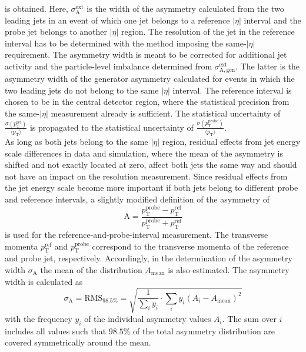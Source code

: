 is obtained. Here, $\sigma_\mathrm{A}^\mathrm{ext}$ is the width of the asymmetry calculated from the two leading jets in an event of which one jet belongs to a reference $|\eta|$ interval and the probe jet belongs to another $|\eta|$ region. The resolution of the jet in the reference interval has to be determined with the method imposing the same-$|\eta|$ requirement. The asymmetry width is meant to be corrected for additional jet activity and the particle-level imbalance determined from $\sigma_\mathrm{A, \mathrm{gen}}^\mathrm{ext}$. The latter is the asymmetry width of the generator asymmetry calculated for events in which the two leading jets do not belong to the same $|\eta|$ interval. The reference interval is chosen to be in the central detector region, where the statistical precision from the same-$|\eta|$ measurement already is sufficient. The statistical uncertainty of $\frac{\sigma (p^\mathrm{ref}_\mathrm{T})}{{\langle p_\mathrm{T} \rangle}}$ is propagated to the statistical uncertainty of $\frac{\sigma (p^\mathrm{probe}_\mathrm{T})}{\langle p_\mathrm{T} \rangle}$. \\
As long as both jets belong to the same $|\eta|$ region, residual effects from jet energy scale differences in data and simulation, where the mean of the asymmetry is shifted and not exactly located at zero, affect both jets the same way and should not have an impact on the resolution measurement. Since residual effects from the jet energy scale become more important if both jets belong to different probe and reference intervals, a slightly modified definition of the asymmetry of
\begin{equation}
\label{eq:forwardasymmdef}
  \mathrm{A} = \frac{p^\mathrm{probe}_{\mathrm{T}} - p^\mathrm{ref}_{\mathrm{T}}}{p^\mathrm{probe}_{\mathrm{T}} + p^\mathrm{ref}_{\mathrm{T}}} 
 \end{equation}
is used for the reference-and-probe-interval measurement. The transverse momenta $p^\mathrm{ref}_{\mathrm{T}}$ and $p^\mathrm{probe}_{\mathrm{T}}$ correspond to the transverse momenta of the reference and probe jet, respectively. Accordingly, in the determination of the asymmetry width $\sigma_\mathrm{A}$ the mean of the distribution $A_\mathrm{mean}$ is also estimated. The asymmetry width is calculated as
\begin{equation}
\label{eq:forwardasymmwidthdef}
  \sigma_\mathrm{A} = \mathrm{RMS}_{98.5\%} = \sqrt{\frac{1}{\sum_{i} y_i} \cdot \sum_{i} y_i (A_i-A_\mathrm{mean})^2} 
 \end{equation}
with the frequency $y_i$ of the individual asymmetry values $A_i$. The sum over $i$ includes all values such that $98.5\%$ of the total asymmetry distribution are covered symmetrically around the mean.\\
